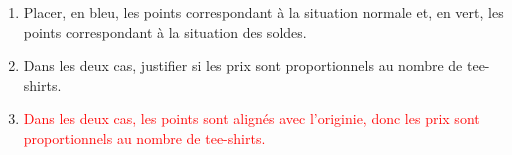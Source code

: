 \begin{corrige}
\begin{enumerate}
        \item Placer, en bleu, les points correspondant à la situation normale et, en vert, les points correspondant à la situation des soldes.
        \item Dans les deux cas, justifier si les prix sont proportionnels au nombre de tee-shirts.
        \item \par\textcolor{red}{Dans les deux cas, les points sont alignés avec l'originie, donc les prix sont proportionnels au nombre de tee-shirts.}
    \end{enumerate}
\end{corrige}

